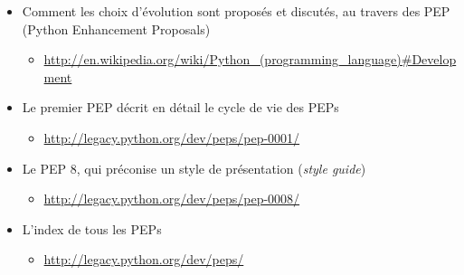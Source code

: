     \begin{itemize}
\tightlist
\item
  Comment les choix d'évolution sont proposés et discutés, au travers
  des PEP (Python Enhancement Proposals)

  \begin{itemize}
  \tightlist
  \item
    \href{http://en.wikipedia.org/wiki/Python\_(programming\_language)\#Development}{http://en.wikipedia.org/wiki/Python\_(programming\_language)\#Development}
  \end{itemize}
\item
  Le premier PEP décrit en détail le cycle de vie des PEPs

  \begin{itemize}
  \tightlist
  \item
    \href{http://legacy.python.org/dev/peps/pep-0001/}{http://legacy.python.org/dev/peps/pep-0001/}
  \end{itemize}
\item
  Le PEP 8, qui préconise un style de présentation (\emph{style guide})

  \begin{itemize}
  \tightlist
  \item
    \href{http://legacy.python.org/dev/peps/pep-0008/}{http://legacy.python.org/dev/peps/pep-0008/}
  \end{itemize}
\item
  L'index de tous les PEPs

  \begin{itemize}
  \tightlist
  \item
    \href{http://legacy.python.org/dev/peps/}{http://legacy.python.org/dev/peps/}
  \end{itemize}
\end{itemize}
